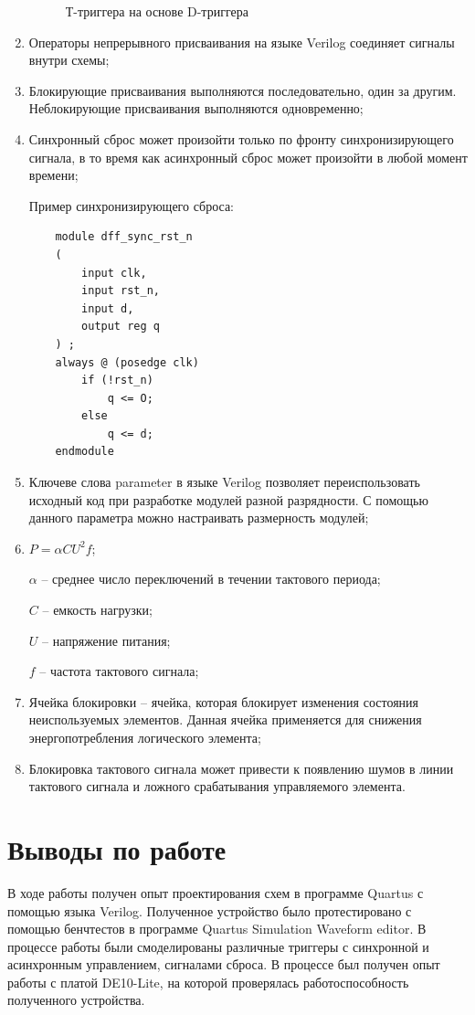 \documentclass[a4paper,14pt]{article}
\begin{document}
\begin{enumerate}
\begin{figure}[H]
		\caption{Т-триггера на основе D-триггера}
		\label{fig:self_made_t_on_d}
	\end{figure}
	\item Операторы непрерывного присваивания на языке Verilog соединяет сигналы внутри схемы;
	\item Блокирующие присваивания выполняются последовательно, один за другим.
	Неблокирующие присваивания выполняются одновременно;
	\item Синхронный сброс может произойти только по фронту синхронизирующего сигнала, в то время как асинхронный сброс может произойти в любой момент времени;

	Пример синхронизирующего сброса:
	\begin{verbatim}
	module dff_sync_rst_n
	(	
		input clk,
		input rst_n,
		input d,
		output reg q
	) ;
	always @ (posedge clk)
		if (!rst_n)
			q <= О;
		else
			q <= d;
	endmodule
	\end{verbatim}
	
	\item Ключеве слова parameter в языке Verilog позволяет переиспользовать исходный код при разработке модулей разной разрядности. 
	С помощью данного параметра можно настраивать размерность модулей;
	\item $ P = \alpha C U^2 f$;
	
	$\alpha$ -- среднее число переключений в течении тактового периода;
	
	$C$ -- емкость нагрузки;
	
	$U$ -- напряжение питания;
	
	$f$ -- частота тактового сигнала;
	
	\item Ячейка блокировки -- ячейка, которая блокирует изменения состояния неиспользуемых элементов. 
	Данная ячейка применяется для снижения энергопотребления логического элемента;
	\item Блокировка тактового сигнала может привести к появлению шумов в линии тактового сигнала и ложного срабатывания управляемого элемента.
\end{enumerate}

\section{Выводы по работе}

В ходе работы получен опыт проектирования схем в программе Quartus с помощью языка Verilog.
Полученное устройство было протестировано с помощью бенчтестов в программе Quartus Simulation Waveform editor.
В процессе работы были смоделированы различные триггеры с синхронной и асинхронным управлением, сигналами сброса.
В процессе был получен опыт работы с платой DE10-Lite, на которой проверялась работоспособность полученного устройства.
\end{document}
